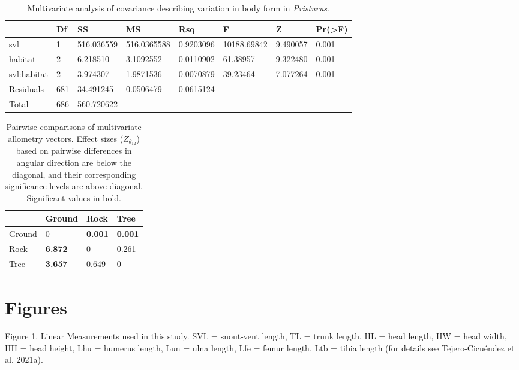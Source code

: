 \documentclass[
  11pt,
]{article}
\begin{document}
\newpage

\begin{table}[H]

\caption{\label{tab:unnamed-chunk-1}Multivariate analysis of covariance describing variation in body form in \textit{Pristurus}.}
\centering
\begin{tabular}[t]{llllllll}
\toprule
  & Df & SS & MS & Rsq & F & Z & Pr(>F)\\
\midrule
svl & 1 & 516.036559 & 516.0365588 & 0.9203096 & 10188.69842 & 9.490057 & 0.001\\
habitat & 2 & 6.218510 & 3.1092552 & 0.0110902 & 61.38957 & 9.322480 & 0.001\\
svl:habitat & 2 & 3.974307 & 1.9871536 & 0.0070879 & 39.23464 & 7.077264 & 0.001\\
Residuals & 681 & 34.491245 & 0.0506479 & 0.0615124 &  &  & \\
Total & 686 & 560.720622 &  &  &  &  & \\
\bottomrule
\end{tabular}
\end{table}

\newpage

\begin{table}[H]

\caption{\label{tab:unnamed-chunk-2}Pairwise comparisons of multivariate allometry vectors. Effect sizes ($Z_{\theta_{12}}$) based on pairwise differences in angular direction are below the diagonal, and their corresponding significance levels are above diagonal. Significant values in bold.}
\centering
\begin{tabular}[t]{llll}
\toprule
  & Ground & Rock & Tree\\
\midrule
Ground & 0 & \textbf{0.001} & \textbf{0.001}\\
Rock & \textbf{6.872} & 0 & 0.261\\
Tree & \textbf{3.657} & 0.649 & 0\\
\bottomrule
\end{tabular}
\end{table}

\newpage

\hypertarget{figures}{%
\section{Figures}\label{figures}}

Figure 1. Linear Measurements used in this study. SVL = snout-vent
length, TL = trunk length, HL = head length, HW = head width, HH = head
height, Lhu = humerus length, Lun = ulna length, Lfe = femur length, Ltb
= tibia length (for details see Tejero-Cicuéndez et al. 2021a).
\hfill\break
\end{document}
